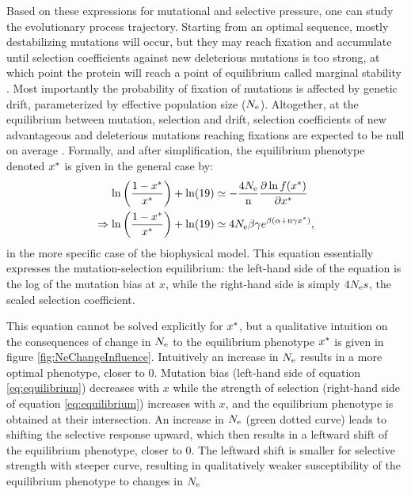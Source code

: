 Based on these expressions for mutational and selective pressure, one can study the evolutionary process trajectory.
Starting from an optimal sequence, mostly destabilizing mutations will occur, but they may reach fixation and accumulate until selection coefficients against new deleterious mutations is too strong, at which point the protein will reach a point of equilibrium called marginal stability \citep{Taverna2002, Bloom2007}.
Most importantly the probability of fixation of mutations is affected by genetic drift, parameterized by effective population size ($N_{\mathrm{e}}$).
Altogether, at the equilibrium between mutation, selection and drift, selection coefficients of new advantageous and deleterious mutations reaching fixations are expected to be null on average \citep{Goldstein2013}.
Formally, and after simplification, the equilibrium phenotype denoted $x^{*}$ is given in the general case by:
\begin{align}
 \ln \left( \frac{1 - x\eq}{x\eq} \right) + \ln (19) & \simeq - \frac{4\Ne}{\Nsite} \frac{ \partial \ln f(x\eq) }{\partial {x\eq}} \\
 \Rightarrow \ln \left( \frac{1 - x\eq}{x\eq} \right) + \ln (19) & \simeq 4\Ne \beta \gamma e^{\beta (\DeltaGmin + \Nsite \gamma x\eq)} \text{,} \label{eq:equilibrium}
\end{align}
in the more specific case of the biophysical model. This equation essentially expresses the mutation-selection equilibrium: the left-hand side of the equation is the log of the mutation bias at $x$, while the right-hand side is simply $4 N_{\mathrm{e}} s$, the scaled selection coefficient.

This equation cannot be solved explicitly for $x^{*}$, but a qualitative intuition on the consequences of change in $N_{\mathrm{e}}$ to the equilibrium phenotype $x^{*}$ is given in figure \ref{fig:NeChangeInfluence}.
Intuitively an increase in $N_{\mathrm{e}}$ results in a more optimal phenotype, closer to $0$.
Mutation bias (left-hand side of equation \ref{eq:equilibrium}) decreases with $x$ while the strength of selection (right-hand side of equation \ref{eq:equilibrium}) increases with $x$, and the equilibrium phenotype is obtained at their intersection.
An increase in $N_{\mathrm{e}}$ (green dotted curve) leads to shifting the selective response upward, which then results in a leftward shift of the equilibrium phenotype, closer to $0$.
The leftward shift is smaller for selective strength with steeper curve, resulting in qualitatively weaker susceptibility of the equilibrium phenotype to changes in $N_{\mathrm{e}}$

